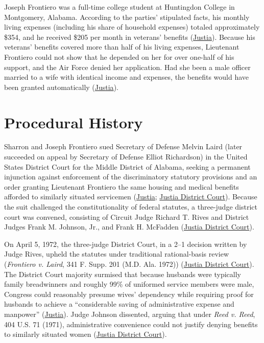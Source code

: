 \documentclass[12pt]{article}
\begin{document}
Joseph Frontiero was a full-time college student at Huntingdon College in Montgomery, Alabama. According to the parties' stipulated facts, his monthly living expenses (including his share of household expenses) totaled approximately \$354, and he received \$205 per month in veterans' benefits (\href{https://supreme.justia.com/cases/federal/us/411/677/}{Justia}). Because his veterans' benefits covered more than half of his living expenses, Lieutenant Frontiero could not show that he depended on her for over one-half of his support, and the Air Force denied her application. Had she been a male officer married to a wife with identical income and expenses, the benefits would have been granted automatically (\href{https://supreme.justia.com/cases/federal/us/411/677/}{Justia}).

\section{Procedural History}
Sharron and Joseph Frontiero sued Secretary of Defense Melvin Laird (later succeeded on appeal by Secretary of Defense Elliot Richardson) in the United States District Court for the Middle District of Alabama, seeking a permanent injunction against enforcement of the discriminatory statutory provisions and an order granting Lieutenant Frontiero the same housing and medical benefits afforded to similarly situated servicemen (\href{https://supreme.justia.com/cases/federal/us/411/677/}{Justia}; \href{https://law.justia.com/cases/federal/district-courts/FSupp/341/201/1456940/}{Justia District Court}). Because the suit challenged the constitutionality of federal statutes, a three-judge district court was convened, consisting of Circuit Judge Richard T. Rives and District Judges Frank M. Johnson, Jr., and Frank H. McFadden (\href{https://law.justia.com/cases/federal/district-courts/FSupp/341/201/1456940/}{Justia District Court}).

On April 5, 1972, the three-judge District Court, in a 2--1 decision written by Judge Rives, upheld the statutes under traditional rational-basis review (\textit{Frontiero v. Laird}, 341 F. Supp. 201 (M.D. Ala. 1972)) (\href{https://law.justia.com/cases/federal/district-courts/FSupp/341/201/1456940/}{Justia District Court}). The District Court majority surmised that because husbands were typically family breadwinners and roughly 99\% of uniformed service members were male, Congress could reasonably presume wives' dependency while requiring proof for husbands to achieve a ``considerable saving of administrative expense and manpower'' (\href{https://supreme.justia.com/cases/federal/us/411/677/}{Justia}). Judge Johnson dissented, arguing that under \textit{Reed v. Reed}, 404 U.S. 71 (1971), administrative convenience could not justify denying benefits to similarly situated women (\href{https://law.justia.com/cases/federal/district-courts/FSupp/341/201/1456940/}{Justia District Court}).
\end{document}
